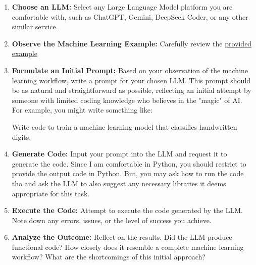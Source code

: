 \begin{enumerate}
    \item \textbf{Choose an LLM:} Select any Large Language Model platform you are comfortable with, such as ChatGPT, Gemini, DeepSeek Coder, or any other similar service.

    \item \textbf{Observe the Machine Learning Example:} Carefully review the \href{https://www.kaggle.com/code/artheon/house-prices-the-ultimate-pipeline-template}{provided example}
    \item \textbf{Formulate an Initial Prompt:} Based on your observation of the machine learning workflow, write a prompt for your chosen LLM. This prompt should be as natural and straightforward as possible, reflecting an initial attempt by someone with limited coding knowledge who believes in the "magic" of AI.  For example, you might write something like:

    \begin{sloppypar}
    {\ttfamily\raggedright Write code to train a machine learning model that classifies handwritten digits.\par}
    \end{sloppypar}



    \item \textbf{Generate Code:} Input your prompt into the LLM and request it to generate the code. Since I am comfortable in Python, you should restrict to provide the output code in Python. But, you may ask how to run the code tho and ask the LLM to also suggest any necessary libraries it deems appropriate for this task.

    \item \textbf{Execute the Code:} Attempt to execute the code generated by the LLM. Note down any errors, issues, or the level of success you achieve.

    \item \textbf{Analyze the Outcome:} Reflect on the results. Did the LLM produce functional code? How closely does it resemble a complete machine learning workflow? What are the shortcomings of this initial approach?

\end{enumerate}


